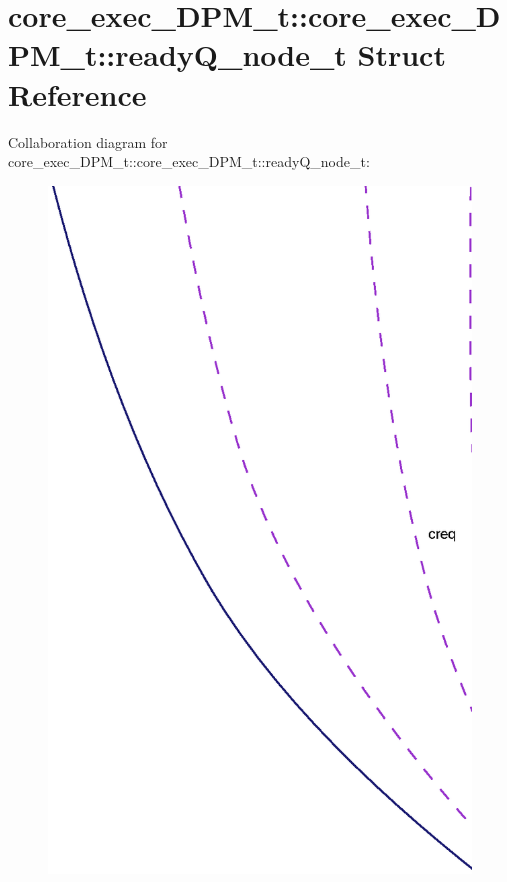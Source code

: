 \section{core\_\-exec\_\-DPM\_\-t::core\_\-exec\_\-DPM\_\-t::readyQ\_\-node\_\-t Struct Reference}
\label{structcore__exec__DPM__t_1_1readyQ__node__t}
Collaboration diagram for core\_\-exec\_\-DPM\_\-t::core\_\-exec\_\-DPM\_\-t::readyQ\_\-node\_\-t:\nopagebreak
\begin{figure}[H]
\begin{center}
\leavevmode
\includegraphics[width=400pt]{structcore__exec__DPM__t_1_1readyQ__node__t__coll__graph}
\end{center}
\end{figure}
